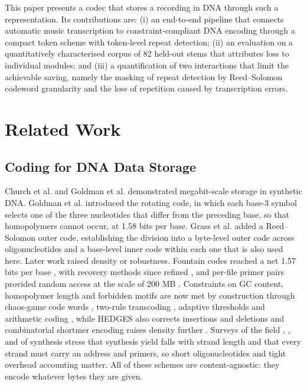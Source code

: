 \documentclass[conference]{IEEEtran}
\begin{document}
This paper presents a codec that stores a recording in DNA through such a representation. Its contributions are: (i) an end-to-end pipeline that connects automatic music transcription to constraint-compliant DNA encoding through a compact token scheme with token-level repeat detection; (ii) an evaluation on a quantitatively characterised corpus of 82 held-out stems that attributes loss to individual modules; and (iii) a quantification of two interactions that limit the achievable saving, namely the masking of repeat detection by Reed--Solomon codeword granularity and the loss of repetition caused by transcription errors.

\section{Related Work}

\subsection{Coding for DNA Data Storage}

Church et al. \cite{church} and Goldman et al. \cite{goldman} demonstrated megabit-scale storage in synthetic DNA. Goldman et al. introduced the rotating code, in which each base-3 symbol selects one of the three nucleotides that differ from the preceding base, so that homopolymers cannot occur, at 1.58 bits per base. Grass et al. \cite{grass} added a Reed--Solomon outer code, establishing the division into a byte-level outer code across oligonucleotides and a base-level inner code within each one that is also used here. Later work raised density or robustness. Fountain codes reached a net 1.57 bits per base \cite{erlich}, with recovery methods since refined \cite{schwarz}, and per-file primer pairs provided random access at the scale of 200 MB \cite{organick}. Constraints on GC content, homopolymer length and forbidden motifs are now met by construction through chaos-game code words \cite{lochel}, two-rule transcoding \cite{ping}, adaptive thresholds \cite{cao} and arithmetic coding \cite{welzel}, while HEDGES also corrects insertions and deletions \cite{press} and combinatorial shortmer encoding raises density further \cite{preuss}. Surveys of the field \cite{dong}, \cite{shomorony}, \cite{xu} and of synthesis \cite{yu} stress that synthesis yield falls with strand length and that every strand must carry an address and primers, so short oligonucleotides and tight overhead accounting matter. All of these schemes are content-agnostic: they encode whatever bytes they are given.
\end{document}
